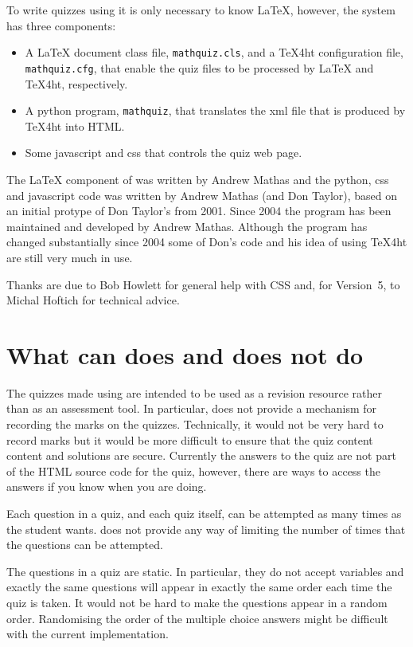 \documentclass[svgnames]{article}
\begin{document}
    To write quizzes using \MathQuiz it is only necessary to know
    \LaTeX, however, the \MathQuiz system has three components:
    \begin{itemize}
      \item A \LaTeX{} document class file, \texttt{mathquiz.cls}, and
      a \TeX 4ht configuration file, \texttt{mathquiz.cfg}, that enable the
      quiz files to be processed by \LaTeX{} and \TeX 4ht, respectively.
      \item A python program, \texttt{mathquiz}, that translates the xml
      file that is produced by \TeX 4ht into  HTML.
      \item Some javascript and css that controls the quiz web page.
    \end{itemize}

   The \LaTeX{} component of \MathQuiz{} was written by Andrew Mathas
   and the python, css and javascript code was written by Andrew Mathas
   (and Don Taylor), based on an initial protype of Don Taylor's from
   2001.  Since 2004 the program has been maintained and developed by
   Andrew Mathas. Although the program has changed substantially since
   2004 some of Don's code and his idea of using \TeX 4ht are still very
   much in use.

   Thanks are due to Bob Howlett for general help with CSS and, for
   Version~5, to  Michal Hoftich for technical advice.

  \section{What can \MathQuiz does and does not do}

    The quizzes made using \MathQuiz are intended to be used as a
    revision resource rather than as an assessment tool. In particular,
    \MathQuiz does not provide a mechanism for recording the marks on
    the quizzes. Technically, it would not be very hard to record marks
    but it would be more difficult to ensure that the quiz content
    content and solutions are secure. Currently the answers to the quiz
    are not part of the HTML source code for the quiz, however, there
    are ways to access the answers if you know when you are doing.

    Each question in a quiz, and each quiz itself, can be attempted as
    many times as the student wants. \MathQuiz does not provide any way
    of limiting the number of times that the questions can be attempted.

    The questions in a \MathQuiz quiz are static. In particular, they do
    not accept variables and exactly the same questions will appear in
    exactly the same order each time the quiz is taken. It would not be
    hard to make the questions appear in a random order. Randomising the
    order of the multiple choice answers might be difficult with the
    current implementation.
\end{document}
